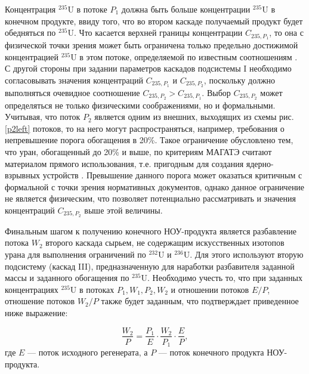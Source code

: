 \newpage

Концентрация $^{235}$U в потоке $P_1$ должна быть больше концентрации $^{235}$U в конечном продукте, ввиду того, что во втором каскаде получаемый продукт будет обедняться по $^{235}$U. Что касается верхней границы концентрации ${C}_{235,{P_1}}$, то она с физической точки зрения может быть ограничена только предельно достижимой концентрацией $^{235}$U в этом потоке, определяемой по известным соотношениям \cite{minenkoPredelnoeObogashcheniePromezhutochnyh1972,sulaberidzeOsobennostiObogashcheniyaKomponentov2006}. С другой стороны при задании параметров каскадов подсистемы I необходимо согласовывать значения концентраций ${C}_{235,{P_1}}$ и ${C}_{235,{P_2}}$, поскольку должно выполняться очевидное соотношение ${C}_{235,{P_2}}{>}{C}_{235,{P_1}}$.
Выбор $C_{235,{P_2}}$ может определяться не только физическими соображениями, но и формальными. Учитывая, что поток $P_2$ является одним из внешних, выходящих из схемы рис. \ref{p2left} потоков, то на него могут распространяться, например, требования о непревышение порога обогащения в 20\%. Такое ограничение обусловлено тем, что уран, обогащенный до 20\% и выше, по критериям МАГАТЭ считают материалом прямого использования, т.е. пригодным для создания ядерно-взрывных устройств \cite{brownOriginsSignificanceLimit2016,pshakinYadernoeNerasprostranenie2006}. Превышение данного порога может оказаться критичным с формальной с точки зрения нормативных документов, однако данное ограничение не является физическим, что позволяет потенциально рассматривать и значения концентраций  $C_{235,{P_2}}$ выше этой величины. 

Финальным шагом к получению конечного НОУ-продукта является разбавление потока $W_2$ второго каскада сырьем, не содержащим искусственных изотопов урана для выполнения ограничений по $^{232}$U и $^{236}$U.
Для этого используют вторую подсистему (каскад III), предназначенную для наработки разбавителя заданной массы и заданного обогащения по $^{235}$U.
Необходимо учесть то, что при заданных концентрациях $^{235}$U в потоках ${P_1}, {W_1}, {P_2}, {W_2}$ и отношении потоков $E/P$, отношение потоков ${W_2}{/P}$ также будет заданным, что подтверждает приведенное ниже выражение:

\begin{equation}
    \label{dc1}
    \frac{W_{2}}{P}=\frac{P_{1}}{E}\cdot\frac{W_{2}}{P_{1}}\cdot\frac{E}{P},
\end{equation}
где $E$ --- поток исходного регенерата, а $P$ --- поток конечного продукта НОУ-продукта.

